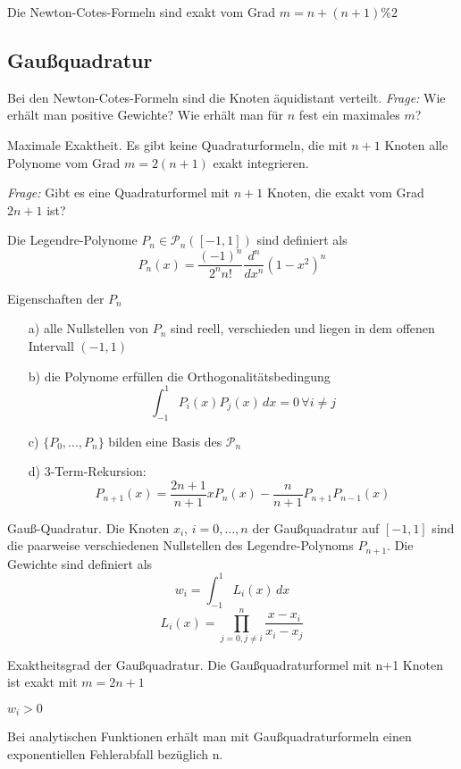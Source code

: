 \begin{theorem}[Satz I.4]
	Die Newton-Cotes-Formeln sind exakt vom Grad $m = n + (n+1)\%2$
\end{theorem}
	
	
\subsection{Gaußquadratur}

Bei den Newton-Cotes-Formeln sind die Knoten äquidistant verteilt. \emph{Frage:} Wie erhält man positive Gewichte? Wie erhält man für $n$ fest ein maximales $m$?

\begin{theorem}[Satz I.5] Maximale Exaktheit. Es gibt keine Quadraturformeln, die mit $n+1$ Knoten alle Polynome vom Grad $m = 2(n+1)$ exakt integrieren.\end{theorem} 	

\emph{Frage:} Gibt es eine Quadraturformel mit $n+1$ Knoten, die exakt vom Grad $2n+1$ ist?

\begin{definition}[Definition I.6] Die Legendre-Polynome $P_n \in \mathcal{P}_n ([-1,1])$ sind definiert als 
$$P_n(x) = \frac{(-1)^n}{2^n n!} \frac{d^n}{dx^n} (1-x^2)^n$$
\end{definition}

\begin{theorem}[Satz I.6] Eigenschaften der $P_n$
	\begin{itemize}
		\item[a)] alle Nullstellen von $P_n$ sind reell, verschieden und liegen in dem offenen Intervall $(-1, 1)$
		\item[b)] die Polynome erfüllen die Orthogonalitätsbedingung 
				$$\int_{-1}^1\!P_i(x) P_j(x)\,dx = 0\,\forall i \ne j$$
		\item[c)] $\{P_0, ..., P_n\}$ bilden eine Basis des $\mathcal{P}_n$
		\item[d)] 3-Term-Rekursion:
		$$P_{n+1}(x) = \frac{2n+1}{n+1} x P_n(x) - \frac{n}{n+1} P_{n+1} P_{n-1}(x)$$
	\end{itemize}
\end{theorem}

\begin{definition}[Definition I.7] Gauß-Quadratur. Die Knoten $x_i$, $i=0,...,n$ der Gaußquadratur auf $[-1, 1]$ sind die paarweise verschiedenen Nullstellen des Legendre-Polynoms $P_{n+1}$. Die Gewichte sind definiert als 
	$$w_i = \int^1_{-1}\!L_i(x) \,dx$$	
	$$L_i(x) = \prod_{j=0, j \ne i}^n \frac{x-x_i}{x_i-x_j}$$
\end{definition}


\begin{theorem}[Satz I.7] Exaktheitsgrad der Gaußquadratur. Die Gaußquadraturformel mit n+1 Knoten ist exakt mit $m = 2n+1$
\end{theorem}

\begin{remark}$w_i > 0$\end{remark}
\begin{remark}Bei analytischen Funktionen erhält man mit Gaußquadraturformeln einen exponentiellen Fehlerabfall bezüglich n.\end{remark}